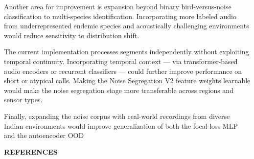 \documentclass[a4paper,12pt]{article}
\begin{document}
\vspace{0.3cm}

\noindent
Another area for improvement is expansion beyond binary bird-versus-noise classification to
multi-species identification. Incorporating more labeled audio from underrepresented endemic
species and acoustically challenging environments would reduce sensitivity to distribution shift.

\vspace{0.3cm}

\noindent
The current implementation processes segments independently without exploiting temporal
continuity. Incorporating temporal context --- via transformer-based audio encoders or recurrent
classifiers --- could further improve performance on short or atypical calls. Making the Noise
Segregation V2 feature weights learnable would make the noise segregation stage more transferable
across regions and sensor types.

\vspace{0.3cm}

\noindent
Finally, expanding the noise corpus with real-world recordings from diverse Indian environments
would improve generalization of both the focal-loss MLP and the autoencoder OOD 

\newpage
\thispagestyle{plain}

\begin{center}
{\fontsize{18}{20}\bfseries REFERENCES}
\end{center}


\vspace{0.5cm}
\end{document}
